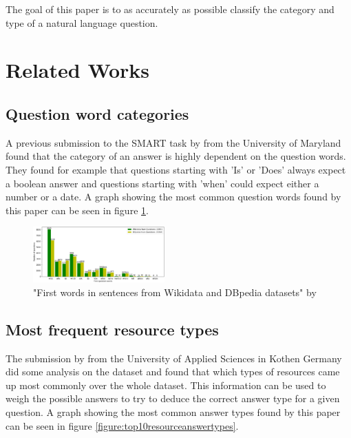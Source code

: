 \documentclass[sigconf]{acmart}
\begin{document}
The goal of this paper is to as accurately as possible classify the category and type of a natural language question.

\section{Related Works}
\subsection{Question word categories}
A previous submission to the \gls{SMART} task by \citet{Maryland:qwords} from the University of Maryland found that the category of an answer is highly dependent on the question words. They found for example that questions starting with 'Is' or 'Does' always expect a boolean answer and questions starting with 'when' could expect either a number or a date\cite{Maryland:qwords}. A graph showing the most common question words found by this paper can be seen in figure \ref{figure:firstquestionwords}. 

\begin{figure}[h]
    \includegraphics[width=0.45\textwidth]{figures/firstQuestionWords.png}
    \caption{"First words in sentences from Wikidata and DBpedia datasets" by \citet{Maryland:qwords}}
    \label{figure:firstquestionwords}
\end{figure}

\subsection{Most frequent resource types}
The submission by \citet{Kothen:analysis} from the University of Applied Sciences in Kothen Germany did some analysis on the dataset and found that which types of resources came up most commonly over the whole dataset. This information can be used to weigh the possible answers to try to deduce the correct answer type for a given question\cite{Kothen:analysis}. A graph showing the most common answer types found by this paper can be seen in figure \ref{figure:top10resourceanswertypes}.
\end{document}
